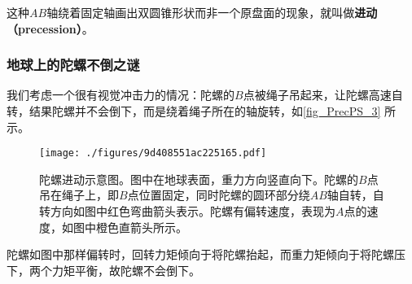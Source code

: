 这种$AB$轴绕着固定轴画出双圆锥形状而非一个原盘面的现象，就叫做\textbf{进动（precession）}。





\subsubsection{地球上的陀螺不倒之谜}



我们考虑一个很有视觉冲击力的情况：陀螺的$B$点被绳子吊起来，让陀螺高速自转，结果陀螺并不会倒下，而是绕着绳子所在的轴旋转，如\autoref{fig_PrecPS_3} 所示。


\begin{figure}[ht]
\centering
\texttt{[image: ./figures/9d408551ac225165.pdf]}
\caption{陀螺进动示意图。图中在地球表面，重力方向竖直向下。陀螺的$B$点吊在绳子上，即$B$点位置固定，同时陀螺的圆环部分绕$AB$轴自转，自转方向如图中红色弯曲箭头表示。陀螺有偏转速度，表现为$A$点的速度，如图中橙色直箭头所示。} \label{fig_PrecPS_3}
\end{figure}


陀螺如图中那样偏转时，回转力矩倾向于将陀螺抬起，而重力矩倾向于将陀螺压下，两个力矩平衡，故陀螺不会倒下。








